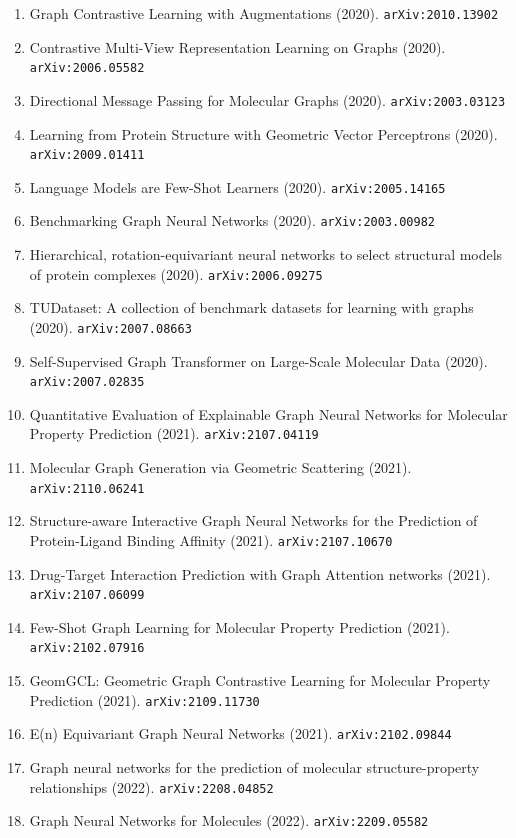 \documentclass[11pt]{article}
\begin{document}
\begin{enumerate}
  \item Graph Contrastive Learning with Augmentations (2020). \texttt{arXiv:2010.13902}
  \item Contrastive Multi-View Representation Learning on Graphs (2020). \texttt{arXiv:2006.05582}
  \item Directional Message Passing for Molecular Graphs (2020). \texttt{arXiv:2003.03123}
  \item Learning from Protein Structure with Geometric Vector Perceptrons (2020). \texttt{arXiv:2009.01411}
  \item Language Models are Few-Shot Learners (2020). \texttt{arXiv:2005.14165}
  \item Benchmarking Graph Neural Networks (2020). \texttt{arXiv:2003.00982}
  \item Hierarchical, rotation-equivariant neural networks to select structural
  models of protein complexes (2020). \texttt{arXiv:2006.09275}
  \item TUDataset: A collection of benchmark datasets for learning with graphs (2020). \texttt{arXiv:2007.08663}
  \item Self-Supervised Graph Transformer on Large-Scale Molecular Data (2020). \texttt{arXiv:2007.02835}
  \item Quantitative Evaluation of Explainable Graph Neural Networks for
  Molecular Property Prediction (2021). \texttt{arXiv:2107.04119}
  \item Molecular Graph Generation via Geometric Scattering (2021). \texttt{arXiv:2110.06241}
  \item Structure-aware Interactive Graph Neural Networks for the Prediction of
  Protein-Ligand Binding Affinity (2021). \texttt{arXiv:2107.10670}
  \item Drug-Target Interaction Prediction with Graph Attention networks (2021). \texttt{arXiv:2107.06099}
  \item Few-Shot Graph Learning for Molecular Property Prediction (2021). \texttt{arXiv:2102.07916}
  \item GeomGCL: Geometric Graph Contrastive Learning for Molecular Property
  Prediction (2021). \texttt{arXiv:2109.11730}
  \item E(n) Equivariant Graph Neural Networks (2021). \texttt{arXiv:2102.09844}
  \item Graph neural networks for the prediction of molecular structure-property
  relationships (2022). \texttt{arXiv:2208.04852}
  \item Graph Neural Networks for Molecules (2022). \texttt{arXiv:2209.05582}

\end{enumerate}
\end{document}
